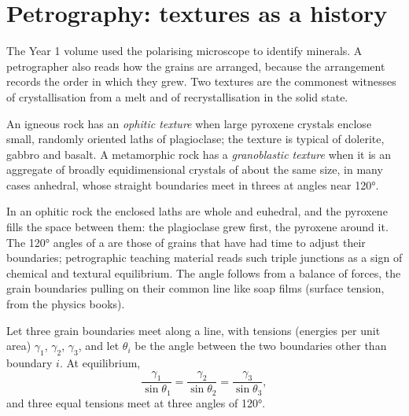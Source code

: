 \section{Petrography: textures as a history}\label{sec:b2:field-lab-methods-2:petrography}

The Year 1 volume used the polarising microscope to identify minerals. A petrographer also reads
how the grains are arranged, because the arrangement records the order in which they grew. Two
textures are the commonest witnesses of crystallisation from a melt and of recrystallisation in
the solid state.

\begin{definition}\label{def:b2:field-lab-methods-2:textures}
An igneous rock has an \emph{ophitic texture} when large pyroxene crystals
enclose small, randomly oriented laths of plagioclase; the texture is typical of dolerite, gabbro
and basalt. A metamorphic rock has a \emph{granoblastic texture} when it
is an aggregate of broadly equidimensional crystals of about the same size, in many cases anhedral,
whose straight boundaries meet in threes at angles near \ang{120}.
\end{definition}

In an ophitic rock the enclosed laths are whole and euhedral, and the pyroxene fills the space
between them: the plagioclase grew first, the pyroxene around it. The \ang{120} angles of a
 are those of grains that have had time to adjust their boundaries; petrographic teaching material reads such triple
junctions as a sign of chemical and textural equilibrium. The angle follows from a balance of forces, the grain boundaries pulling on their
common line like soap films (surface tension, from the physics books).

\begin{proposition}\label{prop:b2:field-lab-methods-2:triple}
Let three grain boundaries meet along a line, with tensions (energies per unit area) $\gamma_1$,
$\gamma_2$, $\gamma_3$, and let $\theta_i$ be the angle between the two boundaries other than
boundary $i$. At equilibrium,
\begin{equation}
\frac{\gamma_1}{\sin\theta_1} = \frac{\gamma_2}{\sin\theta_2} = \frac{\gamma_3}{\sin\theta_3},
\label{eq:b2:field-lab-methods-2:lami}
\end{equation}
and three equal tensions meet at three angles of \ang{120}.
\end{proposition}

